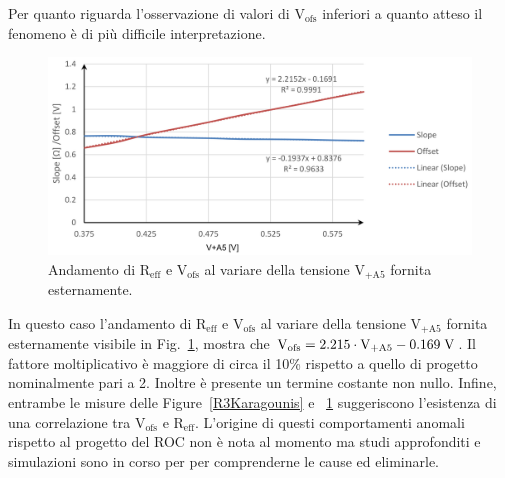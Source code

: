 Per quanto riguarda l'osservazione di valori di $\mathrm{V_{ofs}}$ inferiori a quanto atteso il fenomeno è di più difficile interpretazione.
\begin{figure}
\centering
\includegraphics[width=\textwidth]{Immagini/OffsetKaragounis}
\caption{Andamento di $\mathrm{R_{eff}}$ e $\mathrm{V_{ofs}}$ al variare della tensione $\mathrm{V_{+A5}}$ fornita esternamente.}%
\label{OffsetKaragounis}
\end{figure}
In questo caso l'andamento di $\mathrm{R_{eff}}$ e $\mathrm{V_{ofs}}$ al variare della tensione $\mathrm{V_{+A5}}$ fornita esternamente visibile in Fig.~\ref{OffsetKaragounis}, mostra che $\mathrm{V_{ofs} = 2.215\cdot V_{+A5}- 0.169\rm \; V}$. Il fattore moltiplicativo \`e maggiore di circa il 10\% rispetto a quello di progetto nominalmente pari a 2. Inoltre \`e presente un termine costante non nullo. Infine, entrambe le misure delle Figure~\ref{R3Karagounis} e ~\ref{OffsetKaragounis} suggeriscono l'esistenza di una correlazione tra $\mathrm{V_{ofs}}$ e $\mathrm{R_{eff}}$. L'origine di questi comportamenti anomali rispetto al progetto del ROC non \`e nota al momento ma studi approfonditi e simulazioni sono in corso per per comprenderne le cause ed eliminarle.

%
%
